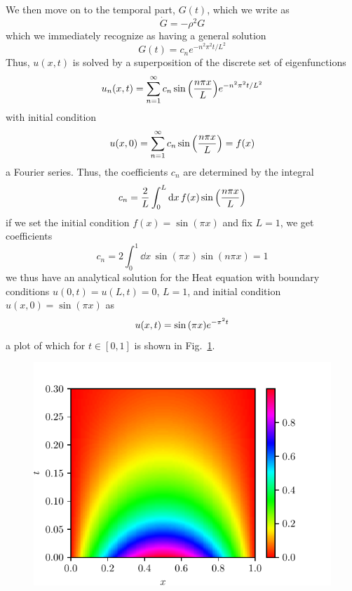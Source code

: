 \documentclass[reprint, english, nofootinbib]{revtex4-2}
\begin{document}
We then move on to the temporal part, $G(t)$, which we write as
\begin{equation}
    \dot G = -\rho^2G
\end{equation}
which we immediately recognize as having a general solution
\begin{equation}
    G(t) = c_n e^{-n^2\pi^2 t / L^2}
\end{equation}
Thus, $u(x, t)$ is solved by a superposition of the discrete set of eigenfunctions
\begin{equation}
    u_n\qty(x, t) = \sum_{n=1}^{\infty} c_n \sin\qty(\frac{n\pi x}{L}) e^{-n^2\pi^2 t / L^2}
\end{equation}
with initial condition
\begin{equation}
    u(x, 0) = \sum_{n=1}^{\infty} c_n \sin\qty(\frac{n\pi x}{L}) = f(x)
\end{equation}
a Fourier series. Thus, the coefficients $c_n$ are determined by the integral
\begin{equation}
    c_n = \frac{2}{L}\int_0^L \dd x \, f(x) \sin\qty(\frac{n\pi x}{L})
\end{equation}
if we set the initial condition $f(x) = \sin(\pi x)$ and fix $L = 1$, we get coefficients
\begin{equation}
    c_n = 2\int_0^1 \dd x \, \sin(\pi x) \sin(n\pi x) = 1
\end{equation}
we thus have an analytical solution for the Heat equation with boundary conditions $u(0, t) = u(L, t) = 0$, $L = 1$, and initial condition $u(x, 0) = \sin(\pi x)$ as
\begin{equation}
    u(x, t) = \sin\qty(\pi x) e^{-\pi^2 t}
\end{equation}
a plot of which for $t \in [0, 1]$ is shown in Fig.~\ref{fig: heat eqn analytic}.
\begin{figure}[h!tb]
    \center
    \includegraphics[width=.8\columnwidth]{heat_eqn_analytic.pdf}
    \caption{\label{fig: heat eqn analytic}}
\end{figure}
\end{document}
